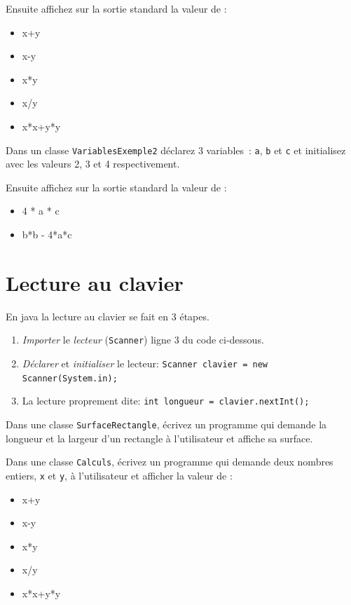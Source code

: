 \documentclass[a4paper,11pt]{article}
\begin{document}
		Ensuite affichez sur la sortie standard la valeur de :
		\begin{itemize}
		 	\item x+y
			\item x-y
			\item x*y
			\item x/y
			\item x*x+y*y
		\end{itemize} 


	\Exercice{} 
		Dans un classe \texttt{VariablesExemple2} déclarez 3 variables~: 
		\texttt{a}, \texttt{b} et \texttt{c} et initialisez avec les valeurs 2, 3 et 4 respectivement.
		
		Ensuite affichez sur la sortie standard la valeur de :
		\begin{itemize}
		 	\item 4 * a * c
			\item b*b - 4*a*c
		\end{itemize} 
	

\section{Lecture au clavier}


	En java la lecture au clavier se fait en 3 étapes.

	\begin{enumerate}
		\item \emph{Importer} le \emph{lecteur} (\texttt{Scanner}) ligne 3 du code ci-dessous.
		\item \emph{Déclarer} et \emph{initialiser} le lecteur:  \texttt{Scanner clavier = new Scanner(System.in);}
		\item La lecture proprement dite: \texttt{int longueur = clavier.nextInt();}
	\end{enumerate}


	\hspeparator


		Dans une classe \texttt{SurfaceRectangle}, écrivez un programme qui demande 
		la longueur et la largeur d'un rectangle à l'utilisateur et affiche sa surface.


	\Exercice{} 
		Dans une classe \texttt{Calculs}, écrivez un programme qui demande 
		deux nombres entiers, \texttt{x} et \texttt{y}, à l'utilisateur et afficher la valeur de :
		\begin{itemize}
		 	\item x+y
			\item x-y
			\item x*y
			\item x/y
			\item x*x+y*y
		\end{itemize} 
\end{document}
